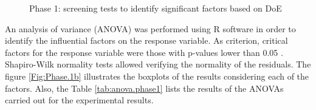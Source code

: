 \documentclass[]{interact}
\theoremstyle{plain}%
\theoremstyle{definition}
\theoremstyle{remark}
\begin{document}
\begin{figure}[!t]
\centering
{}
\hfill
{}
\caption{Phase 1: screening tests to identify significant factors based on DoE}
\end{figure}

An analysis of variance (ANOVA) was performed using R software in order
to identify the influential factors on the response variable. As
criterion, critical factors for the response variable were those with
p-values lower than 0.05 \citep{Perez2018}. Shapiro-Wilk normality tests
allowed verifying the normality of the residuals. The figure
\ref{Fig:Phase.1b} illustrates the boxplots of the results considering
each of the factors. Also, the Table \ref{tab:anova.phase1} lists the
results of the ANOVAs carried out for the experimental results.
\end{document}

